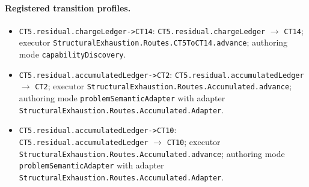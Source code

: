 \paragraph{Registered transition profiles.}
\begin{itemize}
\item \texttt{CT5.\allowbreak{}residual.\allowbreak{}charge\allowbreak{}Ledger-\allowbreak{}>CT14}: \texttt{CT5.\allowbreak{}residual.\allowbreak{}charge\allowbreak{}Ledger} $\to$ \texttt{CT14}; executor \texttt{Structural\allowbreak{}Exhaustion.\allowbreak{}Routes.\allowbreak{}CT5\allowbreak{}To\allowbreak{}CT14.\allowbreak{}advance}; authoring mode \texttt{capability\allowbreak{}Discovery}.
\item \texttt{CT5.\allowbreak{}residual.\allowbreak{}accumulated\allowbreak{}Ledger-\allowbreak{}>CT2}: \texttt{CT5.\allowbreak{}residual.\allowbreak{}accumulated\allowbreak{}Ledger} $\to$ \texttt{CT2}; executor \texttt{Structural\allowbreak{}Exhaustion.\allowbreak{}Routes.\allowbreak{}Accumulated.\allowbreak{}advance}; authoring mode \texttt{problem\allowbreak{}Semantic\allowbreak{}Adapter} with adapter \texttt{Structural\allowbreak{}Exhaustion.\allowbreak{}Routes.\allowbreak{}Accumulated.\allowbreak{}Adapter}.
\item \texttt{CT5.\allowbreak{}residual.\allowbreak{}accumulated\allowbreak{}Ledger-\allowbreak{}>CT10}: \texttt{CT5.\allowbreak{}residual.\allowbreak{}accumulated\allowbreak{}Ledger} $\to$ \texttt{CT10}; executor \texttt{Structural\allowbreak{}Exhaustion.\allowbreak{}Routes.\allowbreak{}Accumulated.\allowbreak{}advance}; authoring mode \texttt{problem\allowbreak{}Semantic\allowbreak{}Adapter} with adapter \texttt{Structural\allowbreak{}Exhaustion.\allowbreak{}Routes.\allowbreak{}Accumulated.\allowbreak{}Adapter}.
\end{itemize}
\endgroup
